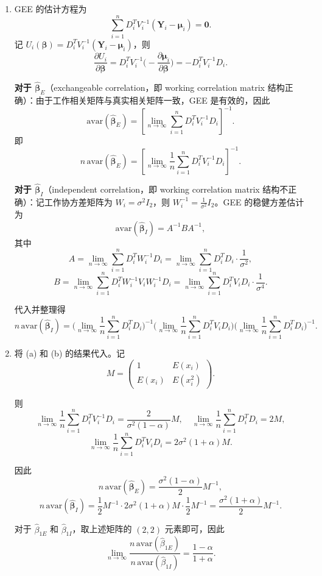 \begin{enumerate}[label=(\alph*)]
\item GEE 的估计方程为
\[
  \sum_{i=1}^n D_i^T V_i^{-1}(\boldsymbol{Y}_i - \boldsymbol{\mu}_i) = \boldsymbol{0}.
\]
记 $U_i(\boldsymbol{\beta}) = D_i^T V_i^{-1}(\boldsymbol{Y}_i - \boldsymbol{\mu}_i)$，则
\[
  \frac{\partial U_i}{\partial \boldsymbol{\beta}} = D_i^T V_i^{-1}\Big(-\frac{\partial \boldsymbol{\mu}_i}{\partial \boldsymbol{\beta}}\Big) = -D_i^T V_i^{-1} D_i.
\]

\textbf{对于 $\widehat{\boldsymbol{\beta}}_E$}（exchangeable correlation，即 working correlation matrix 结构正确）：由于工作相关矩阵与真实相关矩阵一致，GEE 是有效的，因此
\[
  \text{avar}(\widehat{\boldsymbol{\beta}}_E) = \left[\lim_{n\to\infty}\sum_{i=1}^n D_i^T V_i^{-1} D_i\right]^{-1}.
\]
即
\[
  n\,\text{avar}(\widehat{\boldsymbol{\beta}}_E) = \left[\lim_{n\to\infty}\frac{1}{n}\sum_{i=1}^n D_i^T V_i^{-1} D_i\right]^{-1}.
\]

\textbf{对于 $\widehat{\boldsymbol{\beta}}_I$}（independent correlation，即 working correlation matrix 结构不正确）：记工作协方差矩阵为 $W_i = \sigma^2 I_2$，则 $W_i^{-1} = \frac{1}{\sigma^2}I_2$。GEE 的稳健方差估计为
\[
  \text{avar}(\widehat{\boldsymbol{\beta}}_I) = A^{-1} B A^{-1},
\]
其中
\[
  A = \lim_{n\to\infty}\sum_{i=1}^n D_i^T W_i^{-1} D_i = \lim_{n\to\infty}\sum_{i=1}^n D_i^T D_i \cdot \frac{1}{\sigma^2},
\]
\[
  B = \lim_{n\to\infty}\sum_{i=1}^n D_i^T W_i^{-1} V_i W_i^{-1} D_i = \lim_{n\to\infty}\sum_{i=1}^n D_i^T V_i D_i \cdot \frac{1}{\sigma^4}.
\]

代入并整理得
\[
  n\,\text{avar}(\widehat{\boldsymbol{\beta}}_I) = \bigg(\lim_{n\to\infty}\frac{1}{n}\sum_{i=1}^n D_i^T D_i\bigg)^{-1} \bigg(\lim_{n\to\infty}\frac{1}{n}\sum_{i=1}^n D_i^T V_i D_i\bigg) \bigg(\lim_{n\to\infty}\frac{1}{n}\sum_{i=1}^n D_i^T D_i\bigg)^{-1}.
\]

\item 将 (a) 和 (b) 的结果代入。记
\[
  M = \begin{pmatrix} 1 & E(x_i) \\ E(x_i) & E(x_i^2) \end{pmatrix}.
\]

则
\[
  \lim_{n\to\infty}\frac{1}{n}\sum_{i=1}^n D_i^T V_i^{-1} D_i = \frac{2}{\sigma^2(1-\alpha)} M, \quad
  \lim_{n\to\infty}\frac{1}{n}\sum_{i=1}^n D_i^T D_i = 2M,
\]
\[
  \lim_{n\to\infty}\frac{1}{n}\sum_{i=1}^n D_i^T V_i D_i = 2\sigma^2(1+\alpha) M.
\]

因此
\[
  n\,\text{avar}(\widehat{\boldsymbol{\beta}}_E) = \frac{\sigma^2(1-\alpha)}{2} M^{-1},
\]
\[
  n\,\text{avar}(\widehat{\boldsymbol{\beta}}_I) = \frac{1}{2}M^{-1} \cdot 2\sigma^2(1+\alpha)M \cdot \frac{1}{2}M^{-1} = \frac{\sigma^2(1+\alpha)}{2} M^{-1}.
\]

对于 $\widehat{\beta}_{1E}$ 和 $\widehat{\beta}_{1I}$，取上述矩阵的 $(2,2)$ 元素即可，因此
\[
  \lim_{n\to\infty} \frac{n\,\text{avar}(\widehat{\beta}_{1E})}{n\,\text{avar}(\widehat{\beta}_{1I})} = \frac{1-\alpha}{1+\alpha}.
\]
\end{enumerate}


